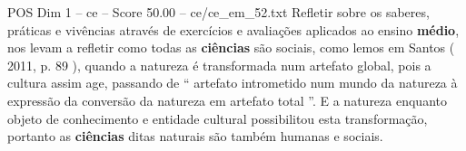 \begin{textsample}{POS Dim 1 – ce – Score 50.00 – ce/ce\_em\_52.txt}
Refletir sobre os saberes, práticas e vivências através de exercícios e avaliações aplicados ao ensino \textbf{médio}, nos levam a refletir como todas as \textbf{ciências} são sociais, como lemos em Santos ( 2011, p. 89 ), quando a natureza é transformada num artefato global, pois a cultura assim age, passando de “ artefato intrometido num mundo da natureza à expressão da conversão da natureza em artefato total ”.
E a natureza enquanto objeto de conhecimento e entidade cultural possibilitou esta transformação, portanto as \textbf{ciências} ditas naturais são também humanas e sociais.

\end{textsample}
